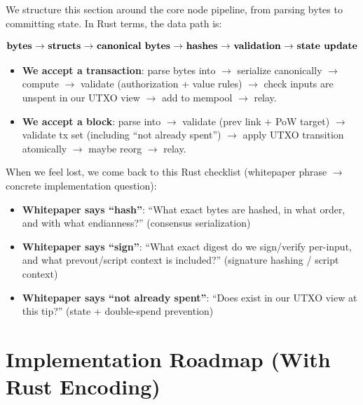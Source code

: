 We structure this section around the core node pipeline, from parsing bytes to committing state. In Rust terms, the data path is:

\[\text{\textbf{bytes} \(\to\) \textbf{structs} \(\to\) \textbf{canonical bytes} \(\to\) \textbf{hashes} \(\to\) \textbf{validation} \(\to\) \textbf{state update}}\]

\begin{itemize}
  \item \textbf{We accept a transaction}: parse bytes into  \(\to\) serialize canonically \(\to\) compute  \(\to\) validate (authorization + value rules) \(\to\) check inputs are unspent in our UTXO view \(\to\) add to mempool \(\to\) relay.
  \item \textbf{We accept a block}: parse into  \(\to\) validate  (prev link + PoW target) \(\to\) validate tx set (including ``not already spent'') \(\to\) apply UTXO transition atomically \(\to\) maybe reorg \(\to\) relay.
\end{itemize}

When we feel lost, we come back to this Rust checklist (whitepaper phrase \(\to\) concrete implementation question):

\begin{itemize}
  \item \textbf{Whitepaper says ``hash''}: ``What exact bytes are hashed, in what order, and with what endianness?'' (consensus serialization)
  \item \textbf{Whitepaper says ``sign''}: ``What exact digest do we sign/verify per-input, and what prevout/script context is included?'' (signature hashing / script context)
  \item \textbf{Whitepaper says ``not already spent''}: ``Does  exist in our UTXO view at this tip?'' (state + double-spend prevention)
\end{itemize}

\section{Implementation Roadmap (With Rust Encoding)}
\label{sec:implementation-roadmap}

